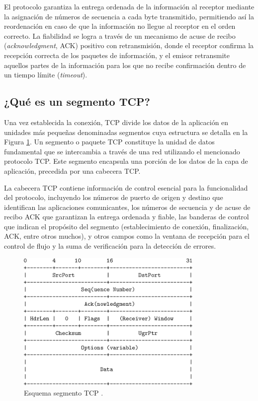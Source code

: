 El protocolo garantiza la entrega ordenada de la información al receptor mediante la asignación de números de secuencia a cada byte transmitido, permitiendo así la reordenación en caso de que la información no llegue al receptor en el orden correcto. La fiabilidad se logra a través de un mecanismo de acuse de recibo (\textit{acknowledgment}, ACK) positivo con retransmisión, donde el receptor confirma la recepción correcta de los paquetes de información, y el emisor retransmite aquellos partes de la información para los que no recibe confirmación dentro de un tiempo límite (\textit{timeout}).

\subsection{¿Qué es un segmento TCP?}
Una vez establecida la conexión, TCP divide los datos de la aplicación en unidades más pequeñas denominadas segmentos cuya estructura se detalla en la Figura \ref{fig:SegmentoTCP}. Un segmento o paquete TCP constituye la unidad de datos fundamental que se intercambia a través de una red utilizando el mencionado protocolo TCP. Este segmento encapsula una porción de los datos de la capa de aplicación, precedida por una cabecera TCP. 

La cabecera TCP contiene información de control esencial para la funcionalidad del protocolo, incluyendo los números de puerto de origen y destino que identifican las aplicaciones comunicantes, los números de secuencia y de acuse de recibo ACK que garantizan la entrega ordenada y fiable, las banderas de control que indican el propósito del segmento (establecimiento de conexión, finalización, ACK, entre otros muchos), y otros campos como la ventana de recepción para el control de flujo y la suma de verificación para la detección de errores.


\begin{figure}[H]
    \centering
    \includegraphics[width=0.8\textwidth]{./img/ent-problema/SegmentoTCP.png}
    \caption{Esquema segmento TCP \cite{tcpsegment}.}
    \label{fig:SegmentoTCP}
\end{figure}

